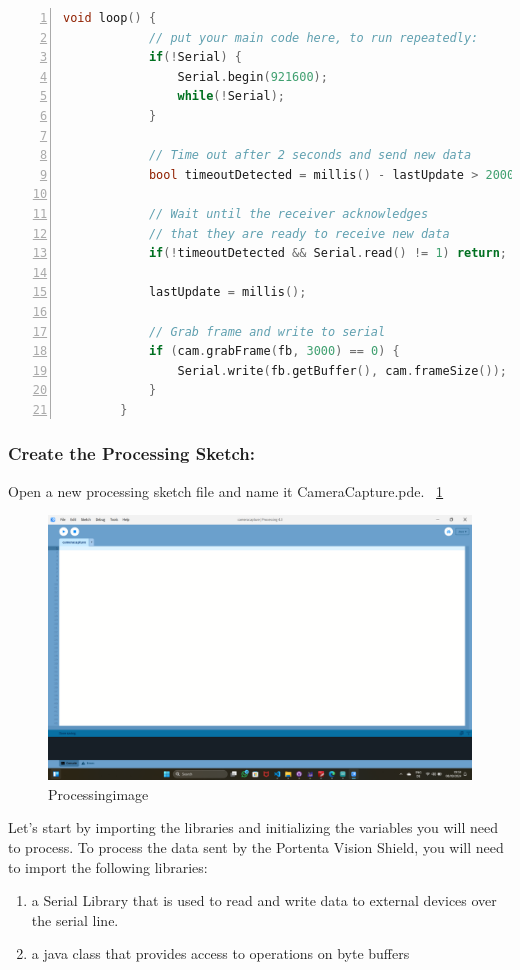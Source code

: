 	\begin{lstlisting}[language=C++, frame=single, numbers=left, basicstyle=\ttfamily\small]
		void loop() {
			// put your main code here, to run repeatedly:
			if(!Serial) {    
				Serial.begin(921600);
				while(!Serial);
			}
			
			// Time out after 2 seconds and send new data
			bool timeoutDetected = millis() - lastUpdate > 2000;
			
			// Wait until the receiver acknowledges
			// that they are ready to receive new data
			if(!timeoutDetected && Serial.read() != 1) return;
			
			lastUpdate = millis();
			
			// Grab frame and write to serial
			if (cam.grabFrame(fb, 3000) == 0) {
				Serial.write(fb.getBuffer(), cam.frameSize());
			}
		}
	\end{lstlisting}
	
	\subsubsection{Create the Processing Sketch:} Open a new processing sketch file and name it CameraCapture.pde. ~\ref{Processingimage} \cite{portentaVisionShieldCamera:2024}
	
	\begin{figure}
		\begin{center}
			\includegraphics[width=0.7\linewidth]{Images/VisionShield/CameracaptureProcessing.png}
			\caption{Processingimage}
			\label{Processingimage}
		\end{center}
	\end{figure}
	
	Let's start by importing the libraries and initializing the variables you will need to process. To process the data sent by the Portenta Vision Shield, you will need to import the following libraries:
	
	\begin{enumerate}
		\item {} a Serial Library that is used to read and write data to external devices over the serial line.
		\item {} a java class that provides access to operations on byte buffers
	\end{enumerate}
	
